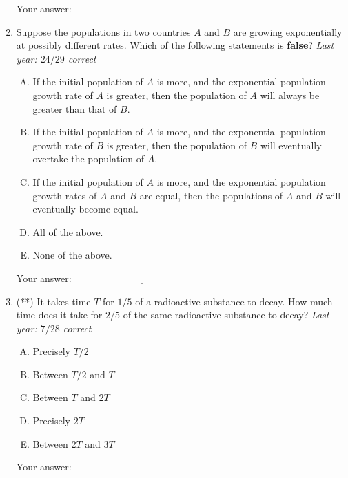 \documentclass[10pt]{amsart}
\begin{document}
\begin{enumerate}
  \vspace{0.1in}
  Your answer: $\underline{\qquad\qquad\qquad\qquad\qquad\qquad\qquad}$
  \vspace{0.1in}
\item Suppose the populations in two countries $A$ and $B$ are growing
  exponentially at possibly different rates. Which of the following
  statements is {\bf false}? {\em Last year: $24/29$ correct}

  \begin{enumerate}[(A)]
  \item If the initial population of $A$ is more, and the exponential
    population growth rate of $A$ is greater, then the population of
    $A$ will always be greater than that of $B$.
  \item If the initial population of $A$ is more, and the exponential
    population growth rate of $B$ is greater, then the population of
    $B$ will eventually overtake the population of $A$.
  \item If the initial population of $A$ is more, and the exponential
    population growth rates of $A$ and $B$ are equal, then the
    populations of $A$ and $B$ will eventually become equal.
  \item All of the above.
  \item None of the above.
  \end{enumerate}

  \vspace{0.1in}
  Your answer: $\underline{\qquad\qquad\qquad\qquad\qquad\qquad\qquad}$
  \vspace{0.1in}

\item (**) It takes time $T$ for $1/5$ of a radioactive substance to
  decay. How much time does it take for $2/5$ of the same radioactive
  substance to decay? {\em Last year: $7/28$ correct}

  \begin{enumerate}[(A)]
  \item Precisely $T/2$
  \item Between $T/2$ and $T$
  \item Between $T$ and $2T$
  \item Precisely $2T$
  \item Between $2T$ and $3T$
  \end{enumerate}

  \vspace{0.1in}
  Your answer: $\underline{\qquad\qquad\qquad\qquad\qquad\qquad\qquad}$
  \vspace{0.1in}


\end{enumerate}
\end{document}
